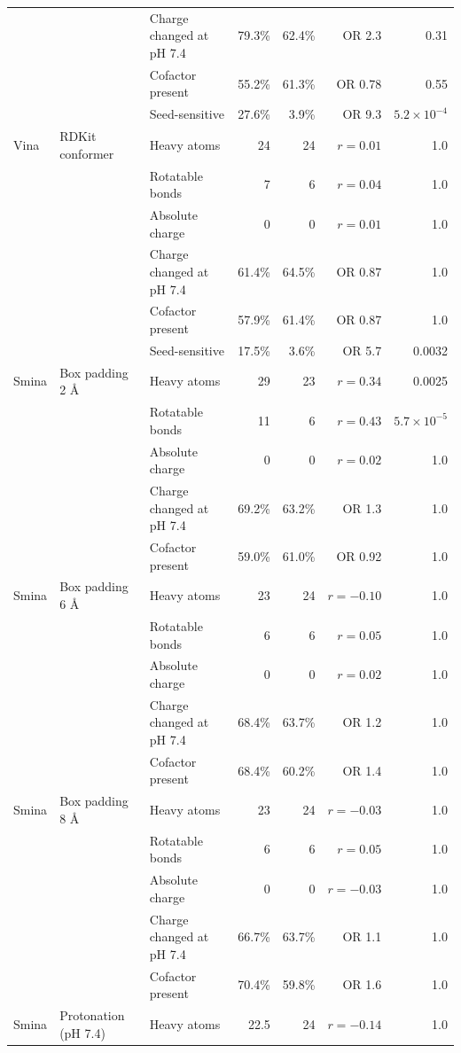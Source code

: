 \begin{longtable}{lllrrrr}
 &  & Charge changed at pH 7.4 & 79.3\% & 62.4\% & OR 2.3 & 0.31 \\
 &  & Cofactor present & 55.2\% & 61.3\% & OR 0.78 & 0.55 \\
 &  & Seed-sensitive & 27.6\% & 3.9\% & OR 9.3 & $5.2\times10^{-4}$ \\
\addlinespace
Vina & RDKit conformer & Heavy atoms & 24 & 24 & $r = 0.01$ & 1.0 \\
 &  & Rotatable bonds & 7 & 6 & $r = 0.04$ & 1.0 \\
 &  & Absolute charge & 0 & 0 & $r = 0.01$ & 1.0 \\
 &  & Charge changed at pH 7.4 & 61.4\% & 64.5\% & OR 0.87 & 1.0 \\
 &  & Cofactor present & 57.9\% & 61.4\% & OR 0.87 & 1.0 \\
 &  & Seed-sensitive & 17.5\% & 3.6\% & OR 5.7 & 0.0032 \\
\addlinespace
Smina & Box padding 2 \AA{} & Heavy atoms & 29 & 23 & $r = 0.34$ & 0.0025 \\
 &  & Rotatable bonds & 11 & 6 & $r = 0.43$ & $5.7\times10^{-5}$ \\
 &  & Absolute charge & 0 & 0 & $r = 0.02$ & 1.0 \\
 &  & Charge changed at pH 7.4 & 69.2\% & 63.2\% & OR 1.3 & 1.0 \\
 &  & Cofactor present & 59.0\% & 61.0\% & OR 0.92 & 1.0 \\
\addlinespace
Smina & Box padding 6 \AA{} & Heavy atoms & 23 & 24 & $r = -0.10$ & 1.0 \\
 &  & Rotatable bonds & 6 & 6 & $r = 0.05$ & 1.0 \\
 &  & Absolute charge & 0 & 0 & $r = 0.02$ & 1.0 \\
 &  & Charge changed at pH 7.4 & 68.4\% & 63.7\% & OR 1.2 & 1.0 \\
 &  & Cofactor present & 68.4\% & 60.2\% & OR 1.4 & 1.0 \\
\addlinespace
Smina & Box padding 8 \AA{} & Heavy atoms & 23 & 24 & $r = -0.03$ & 1.0 \\
 &  & Rotatable bonds & 6 & 6 & $r = 0.05$ & 1.0 \\
 &  & Absolute charge & 0 & 0 & $r = -0.03$ & 1.0 \\
 &  & Charge changed at pH 7.4 & 66.7\% & 63.7\% & OR 1.1 & 1.0 \\
 &  & Cofactor present & 70.4\% & 59.8\% & OR 1.6 & 1.0 \\
\addlinespace
Smina & Protonation (pH 7.4) & Heavy atoms & 22.5 & 24 & $r = -0.14$ & 1.0 \\

\end{longtable}
